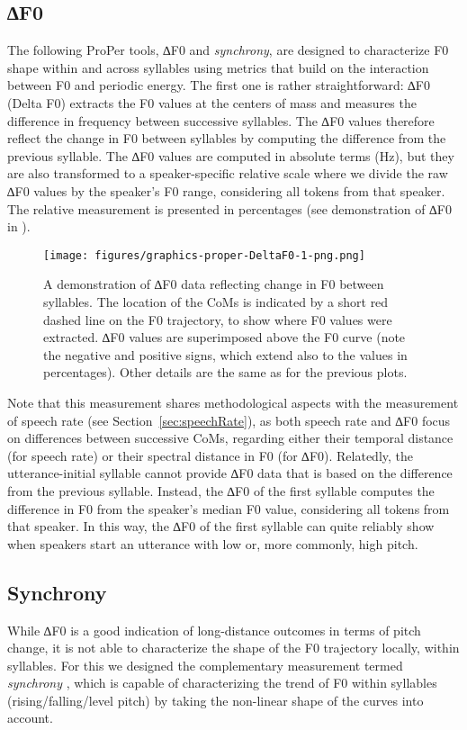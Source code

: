 \subsection{∆F0}\label{sec:DeltaF0}

The following ProPer tools, ∆F0 and \emph{synchrony}, are designed to characterize F0 shape within and across syllables using metrics that build on the interaction between F0 and periodic energy. The first one is rather straightforward: ∆F0 (Delta F0) extracts the F0 values at the centers of mass and measures the difference in frequency between successive syllables. The ∆F0 values therefore reflect the change in F0 between syllables by computing the difference from the previous syllable. The ∆F0 values are computed in absolute terms (Hz), but they are also transformed to a speaker-specific relative scale where we divide the raw ∆F0 values by the speaker's F0 range, considering all tokens from that speaker. The relative measurement is presented in percentages (see demonstration of ∆F0 in ).



\begin{figure}
\texttt{[image: figures/graphics-proper-DeltaF0-1-png.png]} 
\caption{A demonstration of ∆F0 data reflecting change in F0 between syllables. The location of the CoMs is indicated by a short red dashed line on the F0 trajectory, to show where F0 values were extracted. ∆F0 values are superimposed above the F0 curve (note the negative and positive signs, which extend also to the values in percentages). Other details are the same as for the previous plots.}\label{fig:proper-DeltaF0}
\end{figure}

Note that this measurement shares methodological aspects with the measurement of speech rate (see Section~\ref{sec:speechRate}), as both speech rate and ∆F0 focus on differences between successive CoMs, regarding either their temporal distance (for speech rate) or their spectral distance in F0 (for ∆F0).
Relatedly, the utterance-initial syllable cannot provide ∆F0 data that is based on the difference from the previous syllable. Instead, the ∆F0 of the first syllable computes the difference in F0 from the speaker's median F0 value, considering all tokens from that speaker.
In this way, the ∆F0 of the first syllable can quite reliably show when speakers start an utterance with low or, more commonly, high pitch.

\subsection{Synchrony}\label{sec:synchrony}
\begin{sloppypar}
While ∆F0 is a good indication of long-distance outcomes in terms of pitch change, it is not able to characterize the shape of the F0 trajectory locally, within syllables. For this we designed the complementary measurement termed \emph{synchrony} \citep{cangemi2019modellingsk}, which is capable of characterizing the trend of F0 within syllables (rising/falling/level pitch) by taking the non-linear shape of the curves into account.
\end{sloppypar}

